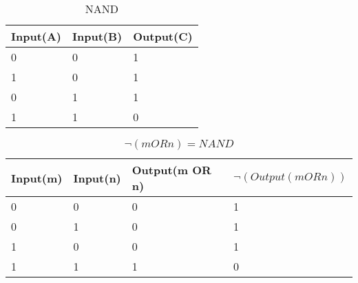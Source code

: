 
\begin{table}
\begin{center}
\begin{tabularx}{150pt}{|X|X|X|}
\textbf{Input(A)} & \textbf{Input(B)} & \textbf{Output(C)} \\ \hline
0 & 0 & 1 \\ \hline
1 & 0 & 1 \\ \hline
0 & 1 & 1 \\ \hline
1 & 1 & 0 \\ \hline
\end{tabularx}
\caption{NAND}
\label{tb:nand}
\end{center}
\end{table}


\begin{table}
\begin{center}
\begin{tabularx}{150pt}{|X|X|X|X|}
\textbf{Input(m)} & \textbf{Input(n)} & \textbf{Output(m OR n)} & \textbf{$\neg(Output(m OR n))$} \\ \hline
0 & 0 & 0 & 1 \\ \hline
0 & 1 & 0 & 1 \\ \hline
1 & 0 & 0 & 1 \\ \hline
1 & 1 & 1 & 0 \\ \hline
\end{tabularx}
\caption{$\neg(m OR n) = NAND$}
\label{tb:nand2}
\end{center}
\end{table}